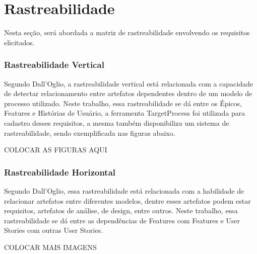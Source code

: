 \chapter{Rastreabilidade}

Nesta seção, será abordada a matriz de rastreabilidade envolvendo os requisitos elicitados.

\subsection{Rastreabilidade Vertical}
Segundo Dall'Oglio, a rastreabilidade vertical está relacionada com a capacidade de detectar relacionamento entre artefatos dependentes dentro de um modelo de processo utilizado. Neste trabalho, essa rastreabilidade se dá entre os Épicos, Features e Histórias de Usuário, a ferramenta TargetProcess foi utilizada para cadastro desses requisitos, a mesma também disponibiliza um sistema de rastreabilidade, sendo exemplificada nas figuras abaixo.

COLOCAR AS FIGURAS AQUI

\subsection{Rastreabilidade Horizontal}
Segundo Dall'Oglio, essa rastreabilidade está relacionada com a habilidade de relacionar artefatos entre diferentes modelos, dentre esses artefatos podem estar requisitos, artefatos de análise, de design, entre outros. Neste trabalho, essa rastreabilidade se dá entre as dependências de Features com Features e User Stories com outras User Stories.

COLOCAR MAIS IMAGENS 